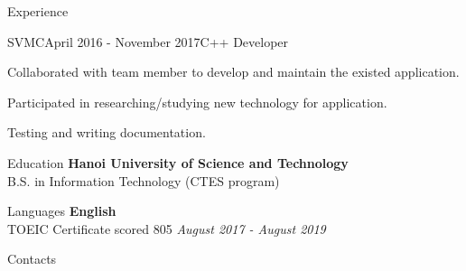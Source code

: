 \documentclass{resume}
\begin{document}
\begin{rSection}{Experience}
    \begin{rSubsection}{SVMC}{April 2016 - November 2017}{C++ Developer}{}
      \item Collaborated with team member to develop and maintain the existed application.
      \item Participated in researching/studying new technology for application.
      \item Testing and writing documentation.
    \end{rSubsection}

  
  \end{rSection}

  \begin{rSection}{Education}
    {\bf Hanoi University of Science and Technology} \\ 
    { B.S. in Information Technology (CTES program) } \\
  \end{rSection}

  \newpage

  \begin{rSection}{Languages}
    {\bf English} \\ 
    { TOEIC Certificate scored 805  } \hfill {\em August 2017 - August 2019} \\
  \end{rSection}

  \begin{rSection}{Contacts}
  \end{rSection}
\end{document}
